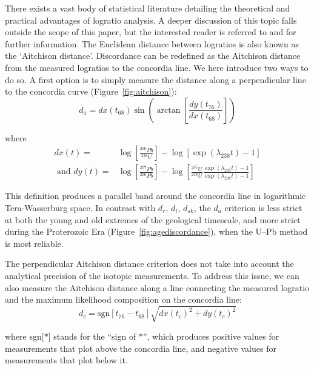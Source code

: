 \documentclass[gchron, manuscript]{copernicus}
\begin{document}
There exists a vast body of statistical literature detailing the
theoretical and practical advantages of logratio analysis. A deeper
discussion of this topic falls outside the scope of this paper, but
the interested reader is referred to \citet{aitchison1986} and
\citet{pawlowsky2015} for further information. The Euclidean distance
between logratios is also known as the `Aitchison distance'.
Discordance can be redefined as the Aitchison distance from the
measured logratios to the concordia line. We here introduce two ways
to do so.  A first option is to simply measure the distance along a
perpendicular line to the concordia curve
(Figure~\ref{fig:aitchison}):
\begin{equation}
  d_{a} = dx(t_{68})
  \sin\!\left(\arctan\!\left[ \frac{dy(t_{76})}{dx(t_{68})} \right]
  \right)
  \label{eq:dperp}
\end{equation}

\noindent where
\begin{equation}
\begin{split}
  dx(t)  = & \log\!\left[\frac{{}^{206}Pb}{{}^{238}U}\right]-
  \log\!\left[\exp(\lambda_{238} t)-1\right] \\
  \mbox{~and~}
  dy(t) = & \log\!\left[\frac{{}^{207}Pb}{{}^{206}Pb}\right] -
      \log\!\left[\frac{{}^{235}U}{{}^{238}U}
        \frac{\exp(\lambda_{235}t)-1}{\exp(\lambda_{238}t)-1}
        \right]
  \end{split}
\end{equation}

This definition produces a parallel band around the concordia line in
logarithmic Tera-Wasserburg space. In contrast with $d_r$, $d_t$,
$d_{sk}$, the $d_a$ criterion is less strict at both the young and old
extremes of the geological timescale, and more strict during the
Proterozoic Era (Figure~\ref{fig:agediscordance}), when the U--Pb
method is most reliable.

The perpendicular Aitchison distance criterion does not take into
account the analytical precision of the isotopic measurements.  To
address this issue, we can also measure the Aitchison distance along a
line connecting the measured logratio and the maximum likelihood
composition on the concordia line:
\begin{equation}
  d_c = \mbox{sgn}[t_{76}-t_{68}] \sqrt{ dx(t_c)^2 + dy(t_c)^2 }
  \label{eq:da}
\end{equation}

\noindent where sgn[$\ast$] stands for the ``sign of $\ast$'', which
produces positive values for measurements that plot above the
concordia line, and negative values for measurements that plot below
it.
\end{document}
